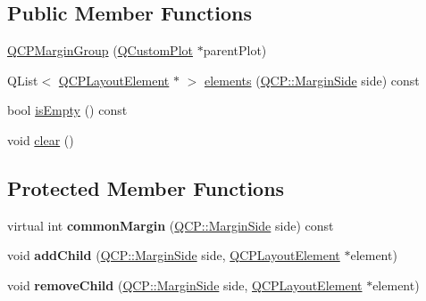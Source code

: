 \subsection*{Public Member Functions}
\begin{DoxyCompactItemize}
\item 
\hyperlink{classQCPMarginGroup_ac481c20678ec5b305d6df330715f4b7b}{Q\+C\+P\+Margin\+Group} (\hyperlink{classQCustomPlot}{Q\+Custom\+Plot} $\ast$parent\+Plot)
\item 
Q\+List$<$ \hyperlink{classQCPLayoutElement}{Q\+C\+P\+Layout\+Element} $\ast$ $>$ \hyperlink{classQCPMarginGroup_ac967a4dc5fe02ae44aeb43511d5e1bd4}{elements} (\hyperlink{namespaceQCP_a7e487e3e2ccb62ab7771065bab7cae54}{Q\+C\+P\+::\+Margin\+Side} side) const
\item 
bool \hyperlink{classQCPMarginGroup_ae0d32656d8a5fc5690c4e7693f9d0539}{is\+Empty} () const
\item 
void \hyperlink{classQCPMarginGroup_a144b67f216e4e86c3a3a309e850285fe}{clear} ()
\end{DoxyCompactItemize}
\subsection*{Protected Member Functions}
\begin{DoxyCompactItemize}
\item 
\mbox{\label{classQCPMarginGroup_aea6a00373b3a0305de56c34d2423ea99}} 
virtual int {\bfseries common\+Margin} (\hyperlink{namespaceQCP_a7e487e3e2ccb62ab7771065bab7cae54}{Q\+C\+P\+::\+Margin\+Side} side) const
\item 
\mbox{\label{classQCPMarginGroup_acb9c3a35acec655c2895b7eb95ee0524}} 
void {\bfseries add\+Child} (\hyperlink{namespaceQCP_a7e487e3e2ccb62ab7771065bab7cae54}{Q\+C\+P\+::\+Margin\+Side} side, \hyperlink{classQCPLayoutElement}{Q\+C\+P\+Layout\+Element} $\ast$element)
\item 
\mbox{\label{classQCPMarginGroup_a20ab3286062957d99b58db683fe725b0}} 
void {\bfseries remove\+Child} (\hyperlink{namespaceQCP_a7e487e3e2ccb62ab7771065bab7cae54}{Q\+C\+P\+::\+Margin\+Side} side, \hyperlink{classQCPLayoutElement}{Q\+C\+P\+Layout\+Element} $\ast$element)
\end{DoxyCompactItemize}
